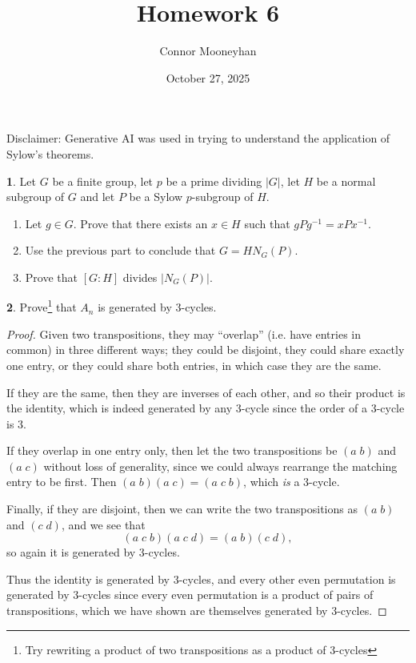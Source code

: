 \documentclass[12pt]{article}
\title{Homework 6}
\author{Connor Mooneyhan}
\date{October 27, 2025}
\theoremstyle{definition}
\newtheorem{ex}{}
\begin{document}
\maketitle

Disclaimer: Generative AI was used in trying to understand the application of Sylow's theorems.

\begin{ex}
	Let $G$ be a finite group, let $p$ be a prime dividing $|G|$, let $H$ be a normal subgroup of $G$ and let $P$ be a Sylow
	$p$-subgroup of $H$.
	\begin{enumerate}
		\item Let $g \in G$.  Prove that there exists an $x \in H$ such that $gPg^{-1} = xPx^{-1}$.
		\item Use the previous part to conclude that $G = HN_G(P)$.
		\item Prove that $[G:H]$ divides $|N_G(P)|$.
	\end{enumerate}

\end{ex}

\begin{ex}
	Prove\footnote{Try rewriting a product of two transpositions as a product of $3$-cycles}
	that $A_n$ is generated by $3$-cycles.
\end{ex}
\begin{proof}
	Given two transpositions, they may ``overlap'' (i.e. have entries in common) in three different ways; they could be disjoint, they could share exactly one entry, or they could share both entries, in which case they are the same.

	If they are the same, then they are inverses of each other, and so their product is the identity, which is indeed generated by any 3-cycle since the order of a 3-cycle is 3.

	If they overlap in one entry only, then let the two transpositions be $(a\;b)$ and $(a\;c)$ without loss of generality, since we could always rearrange the matching entry to be first.
	Then $(a\;b)(a\;c)=(a\;c\;b)$, which \textit{is} a 3-cycle.

	Finally, if they are disjoint, then we can write the two transpositions as $(a\;b)$ and $(c\;d)$, and we see that \begin{equation*}
		(a\;c\;b)(a\;c\;d) = (a\;b)(c\;d),
	\end{equation*}
	so again it is generated by 3-cycles.

	Thus the identity is generated by 3-cycles, and every other even permutation is generated by 3-cycles since every even permutation is a product of pairs of transpositions, which we have shown are themselves generated by 3-cycles.
\end{proof}
\end{document}
